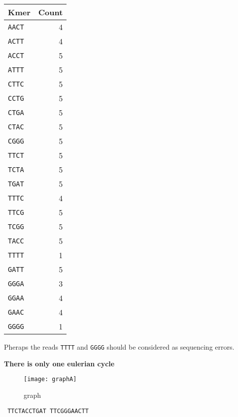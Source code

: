 \begin{Answer} [
  ref={exA},
  number={6}
 ]

  \Question

\begin{tabular}{ | l | r | }
  \hline
  \textbf{Kmer} & \textbf{Count} \\ \hline
  \texttt{AACT} & 4 \\ \hline
  \texttt{ACTT} & 4 \\ \hline
  \texttt{ACCT} & 5 \\ \hline
  \texttt{ATTT} & 5 \\ \hline
  \texttt{CTTC} & 5 \\ \hline
  \texttt{CCTG} & 5 \\ \hline
  \texttt{CTGA} & 5 \\ \hline
  \texttt{CTAC} & 5 \\ \hline
  \texttt{CGGG} & 5 \\ \hline
  \texttt{TTCT} & 5 \\ \hline
  \texttt{TCTA} & 5 \\ \hline
  \texttt{TGAT} & 5 \\ \hline
  \texttt{TTTC} & 4 \\ \hline
  \texttt{TTCG} & 5 \\ \hline
  \texttt{TCGG} & 5 \\ \hline
  \texttt{TACC} & 5 \\ \hline
  \texttt{TTTT} & 1 \\ \hline
  \texttt{GATT} & 5 \\ \hline
  \texttt{GGGA} & 3 \\ \hline
  \texttt{GGAA} & 4 \\ \hline
  \texttt{GAAC} & 4 \\ \hline
  \texttt{GGGG} & 1 \\ \hline
\end{tabular}

Pheraps the reads \texttt{TTTT} and \texttt{GGGG} should be considered as
sequencing errors.

  \Question \textbf{There is only one eulerian cycle}
\begin{figure}[H]
  \centering
  \texttt{[image: graphA]}
  \caption{graph}
\end{figure}

  \Question \texttt{{\color{red} TTC}TACCTGAT{\color{red} TTC}GGGAACTT}
\end{Answer}

